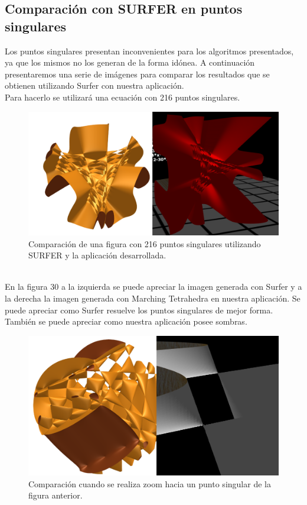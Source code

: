 \documentclass[12pt]{article}
\begin{document}
\subsection{Comparación con SURFER en puntos singulares}
Los puntos singulares presentan inconvenientes para los algoritmos presentados, ya que los mismos no los generan de la forma idónea. A continuación presentaremos una serie de imágenes para comparar los resultados que se obtienen utilizando Surfer con nuestra aplicación. 
\\Para hacerlo se utilizará una ecuación con 216 puntos singulares.\\
\begin{figure}[h!]
\includegraphics[width=\linewidth]{comp1.png}
\caption{Comparación de una figura con 216 puntos singulares utilizando SURFER y la aplicación desarrollada.}
\end{figure}
\\En la figura 30 a la izquierda se puede apreciar la imagen generada con Surfer y a la derecha la imagen generada con Marching Tetrahedra en nuestra aplicación. Se puede apreciar como Surfer resuelve los puntos singulares de mejor forma. También se puede apreciar como nuestra aplicación posee sombras.
\clearpage
\begin{figure}[h!]
\includegraphics[width=\linewidth]{comp2.png}
\caption{Comparación cuando se realiza zoom hacia un punto singular de la figura anterior.}
\end{figure}
\end{document}
